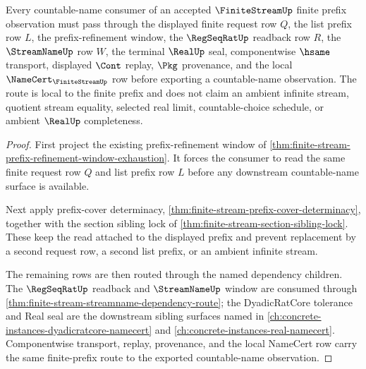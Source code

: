 \begin{theorem}
\label{thm:finite-stream-countable-name-prefix-route}
Every countable-name consumer of an accepted $\FiniteStreamUp$ finite prefix observation must pass through the displayed finite request row $Q$, the list prefix row $L$, the prefix-refinement window, the $\RegSeqRatUp$ readback row $R$, the $\StreamNameUp$ row $W$, the terminal $\RealUp$ seal, componentwise $\hsame$ transport, displayed $\Cont$ replay, $\Pkg$ provenance, and the local $\NameCert_{\FiniteStreamUp}$ row before exporting a countable-name observation. The route is local to the finite prefix and does not claim an ambient infinite stream, quotient stream equality, selected real limit, countable-choice schedule, or ambient $\RealUp$ completeness.
\end{theorem}
\begin{proof}
First project the existing prefix-refinement window of \autoref{thm:finite-stream-prefix-refinement-window-exhaustion}. It forces the consumer to read the same finite request row $Q$ and list prefix row $L$ before any downstream countable-name surface is available.

Next apply prefix-cover determinacy, \autoref{thm:finite-stream-prefix-cover-determinacy}, together with the section sibling lock of \autoref{thm:finite-stream-section-sibling-lock}. These keep the read attached to the displayed prefix and prevent replacement by a second request row, a second list prefix, or an ambient infinite stream.

The remaining rows are then routed through the named dependency children. The $\RegSeqRatUp$ readback and $\StreamNameUp$ window are consumed through \autoref{thm:finite-stream-streamname-dependency-route}; the DyadicRatCore tolerance and Real seal are the downstream sibling surfaces named in \autoref{ch:concrete-instances-dyadicratcore-namecert} and \autoref{ch:concrete-instances-real-namecert}. Componentwise transport, replay, provenance, and the local NameCert row carry the same finite-prefix route to the exported countable-name observation.
\end{proof}
